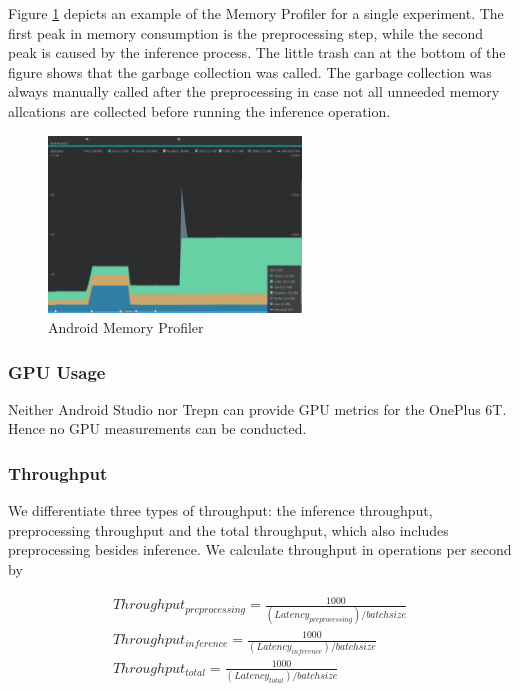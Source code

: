 Figure \ref{fig:prof_mem} depicts an example of the Memory Profiler for a single experiment. The first peak in memory consumption is the preprocessing step, while the second peak is caused by the inference process.
The little trash can at the bottom of the figure shows that the garbage collection was called. The garbage collection was always manually called after the preprocessing in case not all unneeded memory allcations are collected before running the inference operation. 
\begin{figure}[H]
\centering
\includegraphics[width=0.6\textwidth]{./Bilder/profiler_MEM}
\caption{Android Memory Profiler}
\label{fig:prof_mem}
\end{figure}
\subsubsection{GPU Usage}
Neither Android Studio nor Trepn can provide GPU metrics for the OnePlus 6T. Hence no GPU measurements can be conducted.
\subsubsection{Throughput}
We differentiate three types of throughput: the inference throughput, preprocessing throughput and the total throughput, which also includes preprocessing besides inference.
We calculate throughput in operations per second by 

\begin{equation*}
\begin{gathered}
Throughput_{preprocessing} =\frac{1000}{(Latency_{preprocessing}) / batchsize}\\
Throughput_{inference} =\frac{1000}{(Latency_{inference}) / batchsize}\\
Throughput_{total}  =\frac{1000}{(Latency_{total}) / batchsize}
\end{gathered}
\end{equation*}
